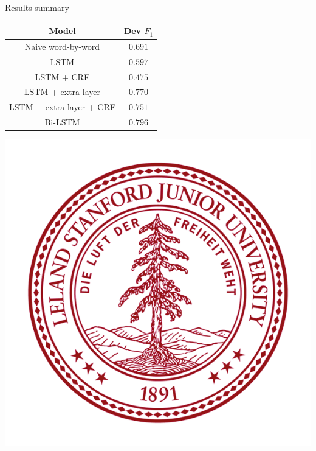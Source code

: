 \documentclass[final]{beamer}
\newlength{\onecolwid}
\begin{document}
\begin{frame}[t]
\begin{columns}[t]
\begin{column}{\onecolwid}


\begin{block}{Results summary}

\begin{center}
   \begin{tabular}{||c | c||}
   \hline
   Model  & Dev $F_1$ \\
   \hline\hline
   Naive word-by-word & $0.691$ \\
   \hline
   LSTM & $0.597$ \\
   \hline
   LSTM + CRF & $0.475$ \\
   \hline
   LSTM + extra layer & $0.770$ \\
   \hline
   LSTM + extra layer + CRF & $0.751$ \\
   \hline
   Bi-LSTM & $0.796$ \\ [1ex]
   \hline
  \end{tabular}
\end{center}


\begin{center}
    \includegraphics[scale=0.5]{figs/Stanford_logo}
\end{center}
\end{block}


\end{column}
\end{columns}
\end{frame}
\end{document}
